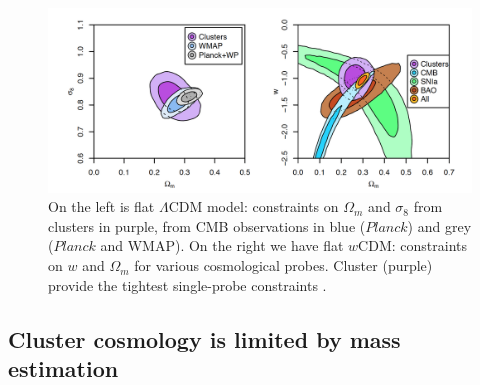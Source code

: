 \begin{figure}[H]
\includegraphics[width = \columnwidth]{figs/cosmology.png}
\caption{On the left is flat $\Lambda$CDM model: constraints on $\Omega_{m}$ and $\sigma_{8}$ from clusters in purple, from CMB observations in blue ($Planck$) and grey ($Planck$ and WMAP). On the right we have flat $w$CDM: constraints on $w$ and $\Omega_{m}$ for various cosmological probes. Cluster (purple) provide the tightest single-probe constraints \citep{mantz15}.  }
\label{clustercosmology}
\end{figure}
\subsection{Cluster cosmology is limited by mass estimation}

